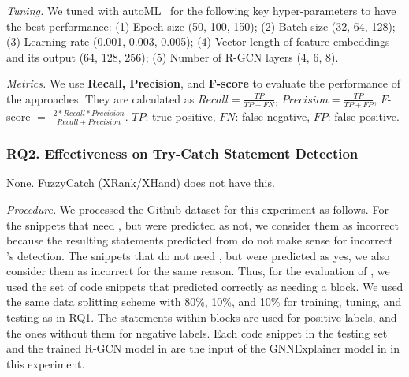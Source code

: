 {\em Tuning.} We tuned {\tool} with autoML~\cite{NNI} for the
following key hyper-parameters to have the best performance: (1) Epoch
size (50, 100, 150); (2) Batch size (32, 64, 128); (3) Learning rate
(0.001, 0.003, 0.005); (4) Vector length of feature embeddings and its
output (64, 128, 256); (5) Number of R-GCN layers (4, 6, 8).

{\em Metrics.} We use \textbf{Recall, Precision}, and {\bf F-score} to
evaluate the performance of the approaches. They are calculated as
$Recall = \frac{TP}{TP+FN}$, $Precision = \frac{TP}{TP+FP}$, $F$-score
$=$ $\frac{2*Recall*Precision}{Recall+Precision}$. $TP$: true
positive, $FN$: false negative, $FP$: false positive.

\subsubsection{RQ2. Effectiveness on Try-Catch Statement Detection\\}

 None. FuzzyCatch (XRank/XHand) does not have
this.

{\em Procedure.} We processed the Github dataset for this experiment
as follows. For the snippets that need , but were
predicted as not, we consider them as incorrect because the resulting
statements predicted from {\xstate} do not make sense for incorrect
{\xblock}'s detection. The snippets that do not need ,
but were predicted as yes, we also consider them as incorrect for the
same reason. Thus, for the evaluation of {\xstate}, we used the set of
code snippets that {\xblock} predicted correctly as needing a
 block. We used the same data splitting scheme with
80\%, 10\%, and 10\% for training, tuning, and testing as in RQ1.  The
statements within  blocks are used for positive
labels, and the ones without them for negative labels. Each code
snippet in the testing set and the trained R-GCN model in {\xblock}
are the input of the GNNExplainer model in {\xstate} in this
experiment.


